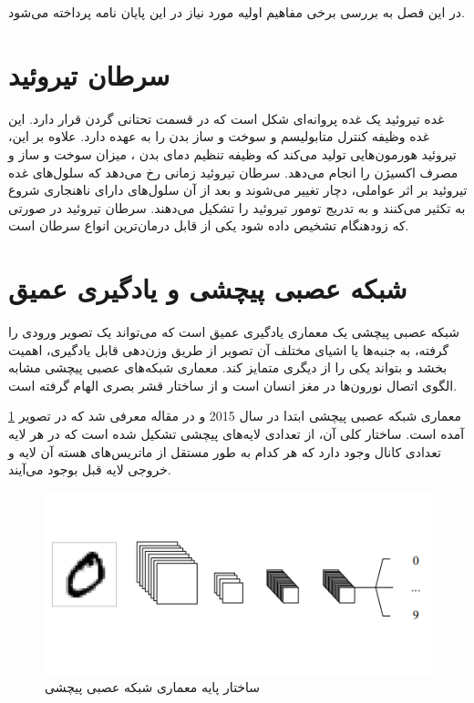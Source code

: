 در این فصل به بررسی برخی مفاهیم اولیه مورد نیاز در این پایان نامه پرداخته می‌شود.

\section{سرطان تیروئید}\label{sec:سرطان-تیروئید}
غده تیروئید یک غده پروانه‌ای شکل است که در قسمت تحتانی گردن قرار دارد.
این غده وظیفه کنترل متابولیسم و سوخت و ساز بدن را به عهده دارد.
علاوه بر این، تیروئید هورمون‌هایی تولید می‌کند که وظیفه تنظیم دمای بدن ، میزان سوخت و ساز و مصرف اکسیژن را انجام می‌دهد.
سرطان تیروئید زمانی رخ می‌دهد که سلول‌های غده تیروئید بر اثر عواملی، دچار تغییر می‌شوند و بعد از آن سلول‌های دارای ناهنجاری شروع به تکثیر می‌کنند و به تدریج تومور تیروئید را تشکیل می‌دهند.
سرطان تیروئید در صورتی که زودهنگام تشخیص داده شود یکی از قابل درمان‌ترین انواع سرطان است.







\section{شبکه عصبی پیچشی و یادگیری عمیق}\label{sec:شبکه عصبی پیچشی و یادگیری عمیق}
شبکه عصبی پیچشی یک معماری یادگیری عمیق است که می‌تواند یک تصویر ورودی را گرفته، به جنبه‌ها یا اشیای مختلف آن تصویر از طریق وزن‌دهی قابل یادگیری، اهمیت بخشد و بتواند یکی را از دیگری متمایز کند. معماری شبکه‌های عصبی پیچشی مشابه الگوی اتصال نورون‌ها در مغز انسان است و از ساختار قشر بصری الهام گرفته است.

معماری شبکه عصبی پیچشی ابتدا در سال 2015 و در مقاله \cite{o2015introduction} معرفی شد که در تصویر \ref{fig:cnnarchitecture} آمده است. ساختار کلی آن، از تعدادی لایه‌های پیچشی تشکیل شده است که در هر لایه تعدادی کانال وجود دارد که هر کدام به طور مستقل از ماتریس‌های هسته آن لایه و خروجی لایه قبل بوجود می‌آیند.
\begin{figure}
    \begin{center}
        \includegraphics[width=0.8\linewidth]{figs/basic_concepts/subs/cnn_image_processing/basic_cnn_arhitecture.PNG}
    \end{center}
    \caption{ساختار پایه معماری شبکه عصبی پیچشی}
    \label{fig:cnnarchitecture}
\end{figure}


